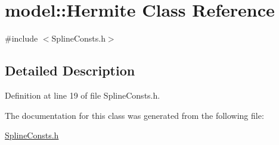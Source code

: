 \hypertarget{classmodel_1_1_hermite}{}\section{model\+:\+:Hermite Class Reference}
\label{classmodel_1_1_hermite}


{\ttfamily \#include $<$Spline\+Consts.\+h$>$}



\subsection{Detailed Description}


Definition at line 19 of file Spline\+Consts.\+h.



The documentation for this class was generated from the following file\+:\begin{DoxyCompactItemize}
\item 
\hyperlink{_spline_consts_8h}{Spline\+Consts.\+h}\end{DoxyCompactItemize}
